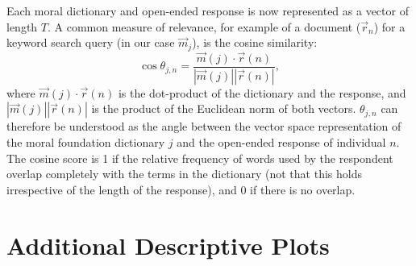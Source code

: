 \documentclass[12pt]{article}
\begin{document}
Each moral dictionary and open-ended response is now represented as a vector of length $T$. A common measure of relevance, for example of a document ($\vec{r}_n$) for a keyword search query (in our case $\vec{m}_j$), is the cosine similarity:
\begin{equation}
\cos\theta_{j,n}=\dfrac{\vec{m}(j)\cdotp\vec{r}(n)}{|\vec{m}(j)||\vec{r}(n)|},
\end{equation}
where $\vec{m}(j)\cdotp\vec{r}(n)$ is the dot-product of the dictionary and the response, and $|\vec{m}(j)||\vec{r}(n)|$ is the product of the Euclidean norm of both vectors. $\theta_{j,n}$ can therefore be understood as the angle between the vector space representation of the moral foundation dictionary $j$ and the open-ended response of individual $n$. The cosine score is 1 if the relative frequency of words used by the respondent overlap completely with the terms in the dictionary (not that this holds irrespective of the length of the response), and 0 if there is no overlap.


\section{Additional Descriptive Plots}\label{app:desc}
\renewcommand\thefigure{\thesection.\arabic{figure}}
\renewcommand\thetable{\thesection.\arabic{table}}
\setcounter{figure}{0}
\setcounter{table}{0}
\end{document}

